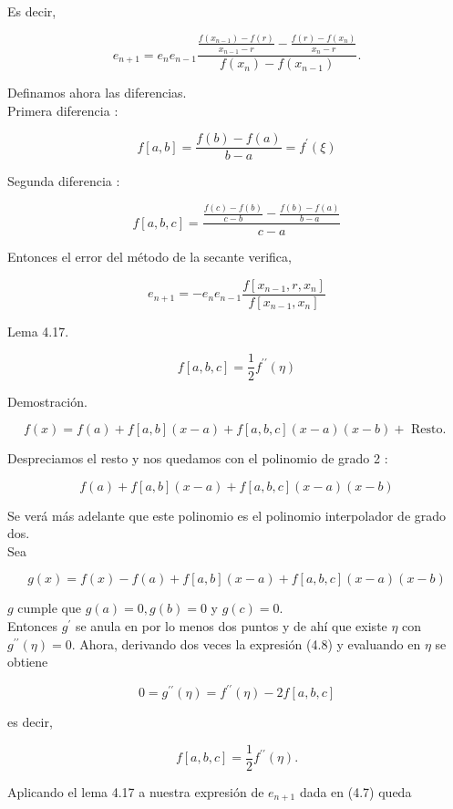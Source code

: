 \documentclass[10pt]{book}
\begin{document}
Es decir,


\begin{equation*}
e_{n+1}=e_{n} e_{n-1} \frac{\frac{f\left(x_{n-1}\right)-f(r)}{x_{n-1}-r}-\frac{f(r)-f\left(x_{n}\right)}{x_{n}-r}}{f\left(x_{n}\right)-f\left(x_{n-1}\right)} . \tag{4.7}
\end{equation*}


Definamos ahora las diferencias.\\
Primera diferencia :

$$
f[a, b]=\frac{f(b)-f(a)}{b-a}=f^{\prime}(\xi)
$$

Segunda diferencia :

$$
f[a, b, c]=\frac{\frac{f(c)-f(b)}{c-b}-\frac{f(b)-f(a)}{b-a}}{c-a}
$$

Entonces el error del método de la secante verifica,

$$
e_{n+1}=-e_{n} e_{n-1} \frac{f\left[x_{n-1}, r, x_{n}\right]}{f\left[x_{n-1}, x_{n}\right]}
$$

Lema 4.17.

$$
f[a, b, c]=\frac{1}{2} f^{\prime \prime}(\eta)
$$

Demostración.

$$
f(x)=f(a)+f[a, b](x-a)+f[a, b, c](x-a)(x-b)+\text { Resto. }
$$

Despreciamos el resto y nos quedamos con el polinomio de grado 2 :

$$
f(a)+f[a, b](x-a)+f[a, b, c](x-a)(x-b)
$$

Se verá más adelante que este polinomio es el polinomio interpolador de grado dos.\\
Sea


\begin{equation*}
g(x)=f(x)-f(a)+f[a, b](x-a)+f[a, b, c](x-a)(x-b) \tag{4.8}
\end{equation*}


$g$ cumple que $g(a)=0, g(b)=0$ y $g(c)=0$.\\
Entonces $g^{\prime}$ se anula en por lo menos dos puntos y de ahí que existe $\eta$ con $g^{\prime \prime}(\eta)=0$. Ahora, derivando dos veces la expresión (4.8) y evaluando en $\eta$ se obtiene

$$
0=g^{\prime \prime}(\eta)=f^{\prime \prime}(\eta)-2 f[a, b, c]
$$

es decir,

$$
f[a, b, c]=\frac{1}{2} f^{\prime \prime}(\eta) .
$$

Aplicando el lema 4.17 a nuestra expresión de $e_{n+1}$ dada en (4.7) queda
\end{document}
